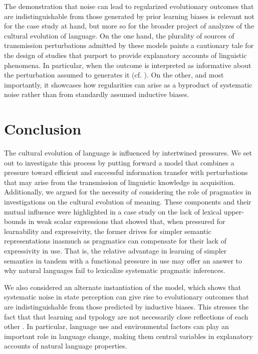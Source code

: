 \documentclass[a4paper]{article}
\begin{document}
The demonstration that noise can lead to regularized evolutionary outcomes that are indistinguishable from those generated by prior learning biases is relevant not for the case study at hand, but more so for the broader project of analyzes of the cultural evolution of language. On the one hand, the plurality of sources of transmission perturbations admitted by these models paints a cautionary tale for the design of studies that purport to provide explanatory accounts of linguistic phenomena. In particular, when the outcome is interpreted as informative about the perturbation assumed to generates it (cf. \citealt{tamariz+kirby:2016}). On the other, and most importantly, it showcases how regularities can arise as a byproduct of systematic noise rather than from standardly assumed inductive biases.



\section{Conclusion}
The cultural evolution of language is influenced by intertwined pressures. We set out to investigate this process by putting forward a model that combines a pressure toward efficient and successful information transfer with perturbations that may arise from the transmission of linguistic knowledge in acquisition. Additionally, we argued for the necessity of considering the role of pragmatics in investigations on the cultural evolution of meaning. These components and their mutual influence were highlighted in a case study on the lack of lexical upper-bounds in weak scalar expressions that showed that, when pressured for learnability and expressivity, the former drives for simpler semantic representations inasmuch as pragmatics can compensate for their lack of expressivity in use. That is, the relative advantage in learning of simpler semantics in tandem with a functional pressure in use may offer an answer to why natural languages fail to lexicalize systematic pragmatic inferences.

We also considered an alternate instantiation of the model, which shows that systematic noise in state perception can give rise to evolutionary outcomes that are indistinguishable from those predicted by inductive biases. This stresses the fact that that learning and typology are not necessarily close reflections of each other \citep{bowerman:2010}. In particular, language use and environmental factors can play an important role in language change, making them central variables in explanatory accounts of natural language properties.  
\end{document}

